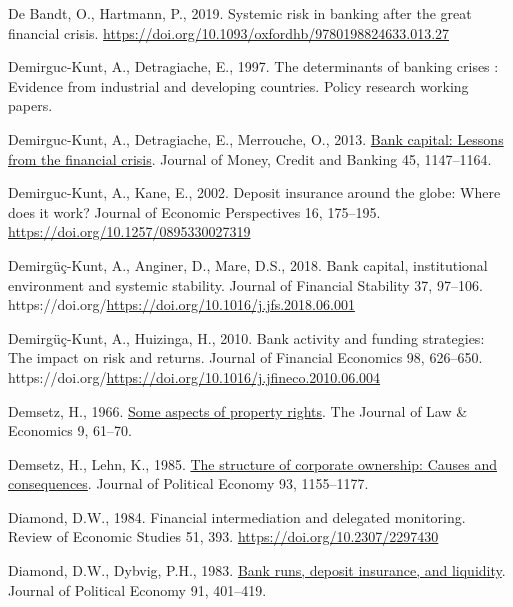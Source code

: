 \documentclass[
  12pt,
  a4paper,
]{scrreprt}
\newlength{\cslhangindent}
\newenvironment{CSLReferences}[2] %
 {\begin{list}{}{%
  \setlength{\itemindent}{0pt}
  \setlength{\leftmargin}{0pt}
  \setlength{\parsep}{0pt}
  \ifodd #1
   \setlength{\leftmargin}{\cslhangindent}
   \setlength{\itemindent}{-1\cslhangindent}
  \fi
  \setlength{\itemsep}{#2\baselineskip}}}
 {\end{list}}
\begin{document}
{{{{\begin{CSLReferences}{1}{0}
De Bandt, O., Hartmann, P., 2019. Systemic risk in banking after the
great financial crisis.
\url{https://doi.org/10.1093/oxfordhb/9780198824633.013.27}

Demirguc-Kunt, A., Detragiache, E., 1997. The determinants of banking
crises : Evidence from industrial and developing countries. Policy
research working papers.

Demirguc-Kunt, A., Detragiache, E., Merrouche, O., 2013.
\href{http://www.jstor.org.queens.ezp1.qub.ac.uk/stable/23463595}{Bank
capital: Lessons from the financial crisis}. Journal of Money, Credit
and Banking 45, 1147--1164.

Demirguc-Kunt, A., Kane, E., 2002. Deposit insurance around the globe:
Where does it work? Journal of Economic Perspectives 16, 175--195.
\url{https://doi.org/10.1257/0895330027319}

Demirgüç-Kunt, A., Anginer, D., Mare, D.S., 2018. Bank capital,
institutional environment and systemic stability. Journal of Financial
Stability 37, 97--106.
https://doi.org/\url{https://doi.org/10.1016/j.jfs.2018.06.001}

Demirgüç-Kunt, A., Huizinga, H., 2010. Bank activity and funding
strategies: The impact on risk and returns. Journal of Financial
Economics 98, 626--650.
https://doi.org/\url{https://doi.org/10.1016/j.jfineco.2010.06.004}

Demsetz, H., 1966. \href{http://www.jstor.org/stable/724993}{Some
aspects of property rights}. The Journal of Law \& Economics 9, 61--70.

Demsetz, H., Lehn, K., 1985.
\href{http://www.jstor.org/stable/1833178}{The structure of corporate
ownership: Causes and consequences}. Journal of Political Economy 93,
1155--1177.

Diamond, D.W., 1984. Financial intermediation and delegated monitoring.
Review of Economic Studies 51, 393.
\url{https://doi.org/10.2307/2297430}

Diamond, D.W., Dybvig, P.H., 1983.
\href{http://www.jstor.org/stable/1837095}{Bank runs, deposit insurance,
and liquidity}. Journal of Political Economy 91, 401--419.


\end{CSLReferences}}}}}
\end{document}

